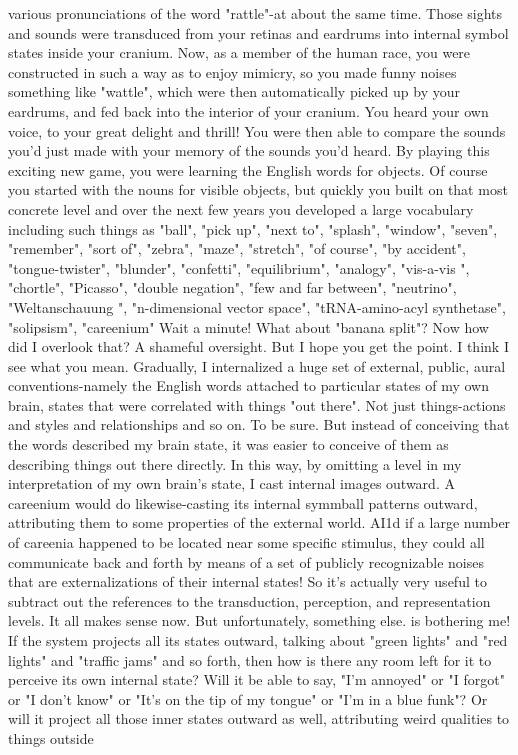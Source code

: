   various pronunciations of the word "rattle"-at about the same time. Those sights
  and sounds were transduced from your retinas and eardrums into internal symbol
  states inside your cranium. Now, as a member of the human race, you were
  constructed in such a way as to enjoy mimicry, so you made funny noises
  something like "wattle", which were then automatically picked up by your
  eardrums, and fed back into the interior of your cranium. You heard your own
  voice, to your great delight and thrill! You were then able to compare the sounds
  you'd just made with your memory of the sounds you'd heard. By playing this
  exciting new game, you were learning the English words for objects. Of course you
  started with the nouns for visible objects, but quickly you built on that most
  concrete level and over the next few years you developed a large vocabulary
  including such things as "ball", "pick up", "next to", "splash", "window", "seven",
  "remember", "sort of", "zebra", "maze", "stretch", "of course", "by accident",
  "tongue-twister", "blunder", "confetti", "equilibrium", "analogy", "vis-a-vis ",
  "chortle", "Picasso", "double negation", "few and far between", "neutrino",
  "Weltanschauung ", "n-dimensional vector space", "tRNA-amino-acyl synthetase",
  "solipsism", "careenium"
\achilles Wait a minute! What about "banana split"?
\tortoise Now how did I overlook that? A shameful oversight. But I hope you get
  the point.
\achilles I think I see what you mean. Gradually, I internalized a huge set of
  external, public, aural conventions-namely the English words attached to particular
  states of my own brain, states that were correlated with things "out there".
\tortoise Not just things-actions and styles and relationships and so on.
\achilles To be sure. But instead of conceiving that the words described my brain
  state, it was easier to conceive of them as describing things out there directly. In
  this way, by omitting a level in my interpretation of my own brain's state, I cast
  internal images outward.
\tortoise A careenium would do likewise-casting its internal symmball patterns
  outward, attributing them to some properties of the external world. AI1d if a large
  number of careenia happened to be located near some specific stimulus, they could
  all communicate back and forth by means of a set of publicly recognizable noises
  that are externalizations of their internal states! So it's actually very useful to
  subtract out the references to the transduction, perception, and representation
  levels.
\achilles It all makes sense now. But unfortunately, something else. is bothering
  me! If the system projects all its states outward, talking about "green lights" and
  "red lights" and "traffic jams" and so forth, then how is there any room left for it to
  perceive its own internal state? Will it be able to say, "I'm annoyed" or "I forgot"
  or "I don't know" or "It's on the tip of my tongue" or "I'm in a blue funk"? Or will
  it project all those inner states outward as well, attributing weird qualities to things
  outside




